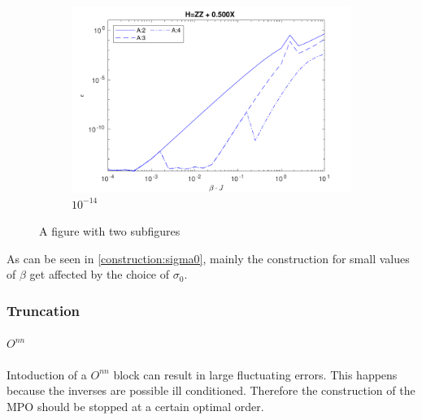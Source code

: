 \begin{figure} \ContinuedFloat
    \centering
    \begin{subfigure}{\textwidth}
        \centering
        \includegraphics[width=0.8\linewidth]{Figuren/mpo_construction/sigm0/e14.pdf}
        \caption{ ${10}^{-14}$}
        \label{fig:sub1}
    \end{subfigure}%
    \caption{A figure with two subfigures}
    \label{fig:sigman0}
\end{figure}




As can be seen in \cref{construction:sigma0}, mainly the construction for small values of $\beta$ get affected by the choice of $\sigma_0$.


\subsubsection{Truncation}

\paragraph{ \( O^{n n} \)}


Intoduction of a \( O^{n n} \) block can result in large fluctuating errors. This happens because the inverses are possible ill conditioned. Therefore the construction of the MPO should be stopped at a certain optimal order.



